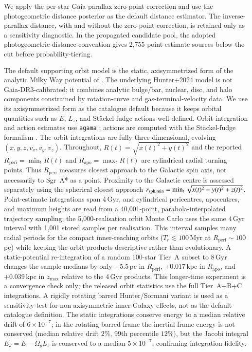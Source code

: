\documentclass{aa}  %
\newcommand{\Rperi}{R_{\mathrm{peri}}}
\newcommand{\Rapo}{R_{\mathrm{apo}}}
\newcommand{\zmax}{z_{\mathrm{max}}}
\begin{document}
We apply the per-star \citet{Lindegren2021} Gaia parallax zero-point
correction and use the \citet{BailerJones2021} photogeometric distance
posterior as the default distance estimator.  The inverse-parallax
distance, with and without the zero-point correction, is retained only as
a sensitivity diagnostic.  In the propagated candidate pool,
the adopted photogeometric-distance convention gives 2{,}755
point-estimate sources below the cut before probability-tiering.

The default supporting orbit model is the static, axisymmetrized form of
the analytic Milky Way potential of \citet{Hunter2024}.  The underlying
Hunter+2024 model is not Gaia-DR3-calibrated; it combines analytic
bulge/bar, nuclear, disc, and halo components constrained by
rotation-curve and gas-terminal-velocity data.  We use its
axisymmetrized form as the catalogue default because it keeps orbital
quantities such as $E$, $L_z$, and St\"ackel-fudge actions well-defined.
Orbit integration and action estimates use \texttt{agama}
\citep{Vasiliev2019}; actions are computed with the St\"ackel-fudge
 formalism \citep{Binney2012,Sanders2016}.  The orbit integrations are
 fully three-dimensional, evolving $(x,y,z,v_x,v_y,v_z)$.  Throughout,
 $R(t)=\sqrt{x(t)^2+y(t)^2}$ and the reported $\Rperi=\min_t R(t)$ and
 $\Rapo=\max_t R(t)$ are cylindrical radial turning points.  Thus
 $\Rperi$ measures closest approach to the Galactic spin axis, not
 necessarily to Sgr~A* as a point.  Proximity to the Galactic centre is
 assessed separately using the spherical closest approach
 $r_{\rm sph,min}=\min_t\sqrt{x(t)^2+y(t)^2+z(t)^2}$.
 Point-estimate integrations span 4\,Gyr, and cylindrical pericentres,
 apocentres, and maximum heights are read
from a 40{,}001-point, parabola-interpolated trajectory sampling; the
5{,}000-realisation orbit Monte Carlo uses the same 4\,Gyr interval with
1{,}001 stored samples per realisation.  This interval samples many
radial periods for the compact inner-reaching orbits ($T_r \lesssim
100$\,Myr at $\Rperi \sim 100$\,pc) while keeping the orbit products
descriptive rather than evolutionary.  A static-potential re-integration
of a random 100-star Tier~A subset to 8\,Gyr changes the sample medians
by only $+5.5$\,pc in $\Rperi$, $+0.017$\,kpc in $\Rapo$, and
$+0.039$\,kpc in $\zmax$ relative to the 4\,Gyr products.  This
longer-time experiment is a convergence check only; the released orbit
statistics use the full Tier~A+B+C integrations.  A rigidly
rotating barred Hunter/Sormani variant
\citep{Sormani2022} is used as a sensitivity test for non-axisymmetric
inner-Galaxy effects, not as the default catalogue definition.  The
static integrations conserve energy to a median relative drift of
$6\times10^{-7}$; in the rotating barred frame the inertial-frame energy
is not conserved (median relative drift $2\%$, 99th percentile $12\%$),
but the Jacobi integral $E_J=E-\Omega_p L_z$ is conserved to a median
$5\times10^{-7}$, confirming integration fidelity.
\end{document}
